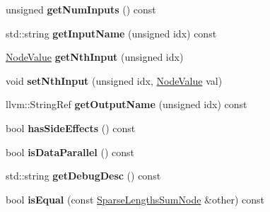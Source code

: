 \begin{DoxyCompactItemize}
\item 
\mbox{\label{classglow_1_1_sparse_lengths_sum_node_af9e501662e05de6f0c21f923e478bb2f}} 
unsigned {\bfseries get\+Num\+Inputs} () const
\item 
\mbox{\label{classglow_1_1_sparse_lengths_sum_node_ac9d66990bee4a927e995a7010d7d0d69}} 
std\+::string {\bfseries get\+Input\+Name} (unsigned idx) const
\item 
\mbox{\label{classglow_1_1_sparse_lengths_sum_node_a08bca51400aac6391f899acfc65cb063}} 
\hyperlink{structglow_1_1_node_value}{Node\+Value} {\bfseries get\+Nth\+Input} (unsigned idx)
\item 
\mbox{\label{classglow_1_1_sparse_lengths_sum_node_a0a27ec19cb24068c89b61d07c777e5d3}} 
void {\bfseries set\+Nth\+Input} (unsigned idx, \hyperlink{structglow_1_1_node_value}{Node\+Value} val)
\item 
\mbox{\label{classglow_1_1_sparse_lengths_sum_node_a3ccb94b82574c2b6bc05cddac30fde80}} 
llvm\+::\+String\+Ref {\bfseries get\+Output\+Name} (unsigned idx) const
\item 
\mbox{\label{classglow_1_1_sparse_lengths_sum_node_a5494c855052dd403624a61dd9fe58304}} 
bool {\bfseries has\+Side\+Effects} () const
\item 
\mbox{\label{classglow_1_1_sparse_lengths_sum_node_a7dd33423e204d60bac50e88437ea0d07}} 
bool {\bfseries is\+Data\+Parallel} () const
\item 
\mbox{\label{classglow_1_1_sparse_lengths_sum_node_aecbf7caa8b93d02f4ae25a440697c2ab}} 
std\+::string {\bfseries get\+Debug\+Desc} () const
\item 
\mbox{\label{classglow_1_1_sparse_lengths_sum_node_ab3ccfd7cec28302a4eb2249d323fd64e}} 
bool {\bfseries is\+Equal} (const \hyperlink{classglow_1_1_sparse_lengths_sum_node}{Sparse\+Lengths\+Sum\+Node} \&other) const

\end{DoxyCompactItemize}
